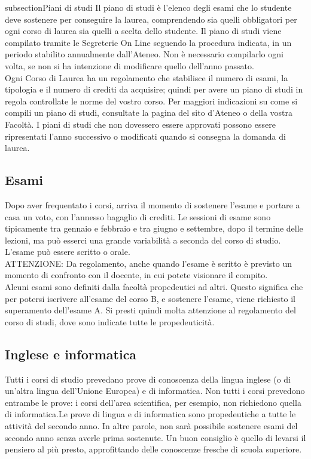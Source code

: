 subsection{Piani di studi}
Il piano di studi è l'elenco degli esami che lo studente deve sostenere per conseguire la laurea, comprendendo sia quelli obbligatori per ogni corso di laurea sia quelli a scelta dello studente. Il piano di studi viene compilato tramite le Segreterie On Line seguendo la procedura indicata, in un periodo stabilito annualmente dall'Ateneo. Non è necessario compilarlo ogni volta, se non si ha intenzione di modificare quello dell'anno passato. \\
Ogni Corso di Laurea ha un regolamento che stabilisce il numero di esami, la tipologia e il numero di crediti da acquisire; quindi per avere un piano di studi in regola controllate le norme del vostro corso. Per maggiori indicazioni su come si compili un piano di studi, consultate la pagina del sito d'Ateneo o della vostra Facoltà. I piani di studi che non dovessero essere approvati possono essere ripresentati l'anno successivo o modificati quando si consegna la domanda di laurea.

\subsection{Esami} 
Dopo aver frequentato i corsi, arriva il momento di sostenere l'esame e portare a casa un voto, con l'annesso bagaglio di crediti. Le sessioni di esame sono tipicamente tra gennaio e febbraio e tra giugno e settembre, dopo il termine delle lezioni, ma può esserci una grande variabilità a seconda del corso di studio. L'esame può essere scritto o orale. \\
ATTENZIONE: Da regolamento, anche quando l'esame è scritto è previsto un momento di confronto con il docente, in cui potete visionare il compito.\\ 
Alcuni esami sono definiti dalla facoltà propedeutici ad altri. Questo significa che per potersi iscrivere all'esame del corso B, e sostenere l'esame, viene richiesto il superamento dell'esame A. Si presti quindi molta attenzione al regolamento del corso di studi, dove sono indicate tutte le propedeuticità.

\subsection{Inglese e informatica}
Tutti i corsi di studio prevedano prove di conoscenza della lingua inglese (o di un'altra lingua dell'Unione Europea) e di informatica. Non tutti i corsi prevedono entrambe le prove: i corsi dell'area scientifica, per esempio, non richiedono quella di informatica.Le prove di lingua e di informatica sono propedeutiche a tutte le attività del secondo anno. In altre parole, non sarà possibile sostenere esami del secondo anno senza averle prima sostenute. Un buon consiglio è quello di levarsi il pensiero al più presto, approfittando delle conoscenze fresche di scuola superiore. 

